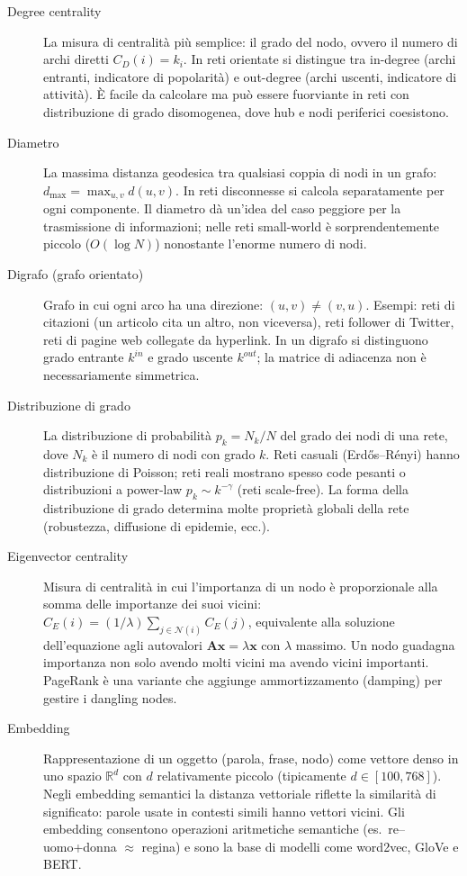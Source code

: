 \documentclass[12pt,a4paper]{article}
\begin{document}
\begin{description}
  \item[Degree centrality] La misura di centralità più semplice: il grado del nodo,
  ovvero il numero di archi diretti $C_D(i)=k_i$. In reti orientate si distingue tra
  in-degree (archi entranti, indicatore di popolarità) e out-degree (archi uscenti,
  indicatore di attività). È facile da calcolare ma può essere fuorviante in reti con
  distribuzione di grado disomogenea, dove hub e nodi periferici coesistono.

  \item[Diametro] La massima distanza geodesica tra qualsiasi coppia di nodi in un grafo:
  $d_{\max} = \max_{u,v} d(u,v)$. In reti disconnesse si calcola separatamente per ogni
  componente. Il diametro dà un'idea del caso peggiore per la trasmissione di informazioni;
  nelle reti small-world è sorprendentemente piccolo ($O(\log N)$) nonostante l'enorme
  numero di nodi.

  \item[Digrafo (grafo orientato)] Grafo in cui ogni arco ha una direzione: $(u,v) \neq
  (v,u)$. Esempi: reti di citazioni (un articolo cita un altro, non viceversa), reti
  follower di Twitter, reti di pagine web collegate da hyperlink. In un digrafo si
  distinguono grado entrante $k^{in}$ e grado uscente $k^{out}$; la matrice di adiacenza
  non è necessariamente simmetrica.

  \item[Distribuzione di grado] La distribuzione di probabilità $p_k = N_k/N$ del grado
  dei nodi di una rete, dove $N_k$ è il numero di nodi con grado $k$. Reti casuali
  (Erdős–Rényi) hanno distribuzione di Poisson; reti reali mostrano spesso code pesanti
  o distribuzioni a power-law $p_k \sim k^{-\gamma}$ (reti scale-free). La forma della
  distribuzione di grado determina molte proprietà globali della rete (robustezza,
  diffusione di epidemie, ecc.).

  \item[Eigenvector centrality] Misura di centralità in cui l'importanza di un nodo è
  proporzionale alla somma delle importanze dei suoi vicini: $C_E(i) = (1/\lambda)
  \sum_{j \in \mathcal{N}(i)} C_E(j)$, equivalente alla soluzione dell'equazione agli
  autovalori $\mathbf{A}\mathbf{x}=\lambda\mathbf{x}$ con $\lambda$ massimo. Un nodo
  guadagna importanza non solo avendo molti vicini ma avendo vicini importanti. PageRank
  è una variante che aggiunge ammortizzamento (damping) per gestire i dangling nodes.

  \item[Embedding] Rappresentazione di un oggetto (parola, frase, nodo) come vettore
  denso in uno spazio $\mathbb{R}^d$ con $d$ relativamente piccolo (tipicamente $d \in
  [100, 768]$). Negli embedding semantici la distanza vettoriale riflette la similarità
  di significato: parole usate in contesti simili hanno vettori vicini. Gli embedding
  consentono operazioni aritmetiche semantiche (es.\ re–uomo+donna $\approx$ regina)
  e sono la base di modelli come word2vec, GloVe e BERT.


\end{description}
\end{document}

